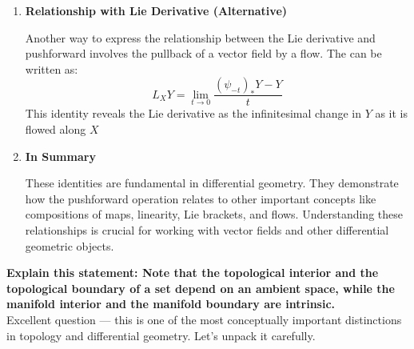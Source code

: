 \documentclass[10pt,a4paper]{report}
\begin{document}
\begin{remark}
\begin{enumerate}
 	\item  \textbf{Relationship with Lie Derivative (Alternative)}

	Another way to express the relationship between the Lie derivative and pushforward involves the pullback of a vector field by a flow. The  can be written as: 
 	\[L_{X}Y=\lim _{t\rightarrow 0}\frac{(\psi _{-t})_{*}Y-Y}{t}\] This identity reveals the Lie derivative as the infinitesimal change in \(Y\) as it is flowed along \(X\)

	\item\textbf{In Summary}
	
	These identities are fundamental in differential geometry. They demonstrate how the pushforward operation relates to other important concepts like compositions of maps, linearity, Lie brackets, and flows. Understanding these relationships is crucial for working with vector fields and other differential geometric objects. 
	 	
 	 \end{enumerate}
 \end{remark}
 
 \newpage
 \textbf{Explain this statement: Note that the topological interior and the topological boundary of a set depend on an ambient space, while the manifold interior and the manifold boundary are intrinsic.}\\
 
 Excellent question — this is one of the most conceptually important distinctions in topology and differential geometry. Let’s unpack it carefully.
\end{document}
